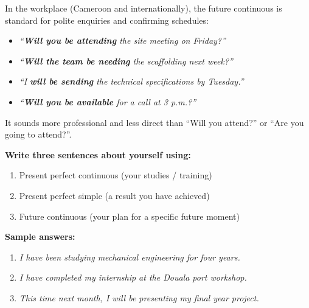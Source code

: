 \documentclass[11pt]{article}
\begin{document}
\begin{savaistu}
In the workplace (Cameroon and internationally), the future continuous is standard for polite enquiries and confirming schedules:
\begin{itemize}
    \item \emph{``\textbf{Will you be attending} the site meeting on Friday?''}
    \item \emph{``\textbf{Will the team be needing} the scaffolding next week?''}
    \item \emph{``I \textbf{will be sending} the technical specifications by Tuesday.''}
    \item \emph{``\textbf{Will you be available} for a call at 3 p.m.?''}
\end{itemize}
It sounds more professional and less direct than ``Will you attend?'' or ``Are you going to attend?''.
\end{savaistu}

\begin{exoresolu}
\textbf{Write three sentences about yourself using:}
\begin{enumerate}
    \item Present perfect continuous (your studies / training)
    \item Present perfect simple (a result you have achieved)
    \item Future continuous (your plan for a specific future moment)
\end{enumerate}
\tcblower
\textbf{Sample answers:}
\begin{enumerate}
    \item \emph{I have been studying mechanical engineering for four years.}
    \item \emph{I have completed my internship at the Douala port workshop.}
    \item \emph{This time next month, I will be presenting my final year project.}
\end{enumerate}
\end{exoresolu}
\end{document}

